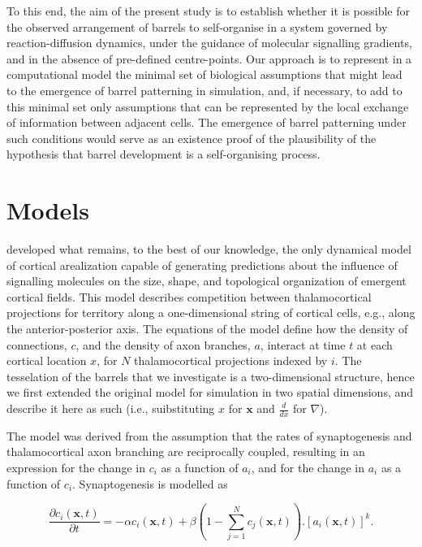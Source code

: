 \documentclass[a4paper,11pt]{article}
\newcommand{\mb}[1]{\mathbf{#1}}
\begin{document}
To this end, the aim of the present study is to establish whether it is possible for the observed arrangement of barrels to self-organise in a system governed by reaction-diffusion dynamics, under the guidance of molecular signalling gradients, and in the absence of pre-defined centre-points. Our approach is to represent in a computational model the minimal set of biological assumptions that might lead to the emergence of barrel patterning in simulation, and, if necessary, to add to this minimal set only assumptions that can be represented by the local exchange of information between adjacent cells. The emergence of barrel patterning under such conditions would serve as an existence proof of the plausibility of the hypothesis that barrel development is a self-organising process.

\section*{Models}

\cite{Karbowski2004} developed what remains, to the best of our knowledge, the only dynamical model of cortical arealization capable of generating predictions about the influence of signalling molecules on the size, shape, and topological organization of emergent cortical fields. This model describes competition between thalamocortical projections for territory along a one-dimensional string of cortical cells, e.g., along the anterior-posterior axis. The equations of the model define how the density of connections, $c$, and the density of axon branches, $a$, interact at time $t$ at each cortical location $x$, for $N$ thalamocortical projections indexed by $i$. The tesselation of the barrels that we investigate is a two-dimensional structure, hence we first extended the original model for simulation in two spatial dimensions, and describe it here as such (i.e., suibstituting $x$ for $\mb{x}$ and $\frac{d}{dx}$ for $\nabla$).

The model was derived from the assumption that the rates of synaptogenesis and thalamocortical axon branching are reciprocally coupled, resulting in an expression for the change in $c_i$ as a function of $a_i$, and for the change in $a_i$ as a function of $c_i$. Synaptogenesis is modelled  as

\begin{equation} \label{eq:Karb2DExt_dc}
\frac{\partial c_i(\mb{x},t)}{\partial t} =-\alpha c_i(\mb{x},t) +\beta  \left(1 - \sum_{j=1}^{N} c_j(\mb{x}, t)\right).[a_i(\mb{x},t)]^k.
\end{equation}
\end{document}
